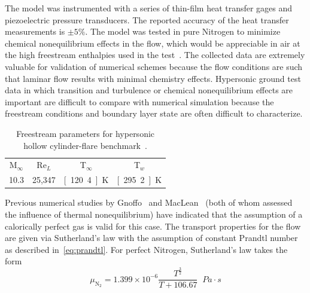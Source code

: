 The model was instrumented with a series of thin-film heat transfer gages and piezoelectric pressure transducers. The reported accuracy of the heat transfer measurements is $\pm 5\%$.  The model was tested in pure Nitrogen to minimize chemical nonequilibrium effects in the flow, which would be appreciable in air at the high freestream enthalpies used in the test~\cite{wadhams_holden_AIAA-2004-917}.  The collected data are extremely valuable for validation of numerical schemes because the flow conditions are such that laminar flow results with minimal chemistry effects.  Hypersonic ground test data in which transition and turbulence or chemical nonequilibrium effects are important are difficult to compare with numerical simulation because the freestream conditions and boundary layer state are often difficult to characterize.

\begin{table}[hbtp]
  \begin{center}
    \caption[Freestream parameters for hypersonic hollow cylinder-flare benchmark.]{Freestream parameters for hypersonic hollow cylinder-flare benchmark~\cite{gnoffo_AIAA-2001-1025}.\label{table:hollow_cylinder-freestream-parameters}}
    \vspace{1em}
    \begin{tabular}{cccc} \hline \hline
      M$_\infty$ & Re$_L$  & T$_\infty$ & T$_w$     \\
      10.3      & 25,347 & \unit[120.4]{K}   & \unit[295.2]{K} \\ \hline
    \end{tabular}
  \end{center}
\end{table}

Previous numerical studies by Gnoffo~\cite{gnoffo_AIAA-2001-1025} and MacLean~\cite{maclean_AIAA-2004-529} (both of whom assessed the influence of thermal nonequilibrium) have indicated that the assumption of a calorically perfect gas is valid for this case. The transport properties for the flow are given via Sutherland's law with the assumption of constant Prandtl number as described in~\eqref{eq:prandtl}.  For perfect Nitrogen, Sutherland's law takes the form
\begin{equation}
  \label{eq:sutherland_N2}
  \mu_{\text{N$_2$}} =  1.399\times10^{-6}\frac{T^\frac{3}{2}}{T + 106.67}\;\; \unit{Pa\cdot s}
\end{equation}

